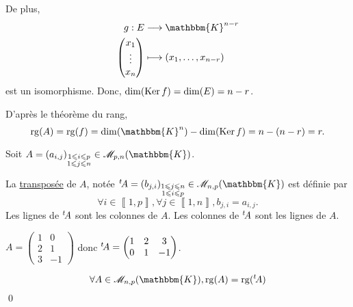 \begin{prv}
	De plus,
	\begin{align*}
		g: E &\longrightarrow \mathbbm{K}^{n-r} \\
		\begin{pmatrix}
			x_1\\
			\vdots\\
			x_n
		\end{pmatrix} &\longmapsto (x_1, \ldots, x_{n-r})
	\end{align*} est un isomorphisme. Donc, $\dim(\operatorname{Ker} f) = \dim(E) = n - r$.
	
	D'après le théorème du rang, \[
		\rg(A) = \rg(f) = \dim(\mathbbm{K}^n) - \dim(\Ker f) = n - (n - r) = r
	.\]
\end{prv}

\begin{defn}
	Soit $A = (a_{i,j})_{\substack{1\le i\le p\\1\le j\le n}} \in \mathcal{M}_{p,n}(\mathbbm{K})$.

	La \underline{transposée} de $A$, notée $\t A = (b_{j,i})_{\substack{1\le j\le n\\1\le i\le p}} \in \mathcal{M}_{n,p}(\mathbbm{K})$ est définie par \[
		\forall i \in \left\llbracket 1,p \right\rrbracket, \forall j \in \left\llbracket 1,n \right\rrbracket, b_{j,i} = a_{i,j}.
	\] Les lignes de ${}^t\! A$ sont les colonnes de $A$. Les colonnes de ${}^t\! A$ sont les lignes de $A$.
\end{defn}

\begin{exm}
	$A = \begin{pmatrix}
		1&0\\
		2&1\\
		3&-1
	\end{pmatrix}$ donc ${}^t\! A = \begin{pmatrix}
		1&2&3\\
		0&1&-1
	\end{pmatrix}$.
\end{exm}

\begin{crlr}
	\[
		\forall A \in \mathcal{M}_{n,p}(\mathbbm{K}), \rg(A) = \rg(\t A)
	\] \qed
\end{crlr}

